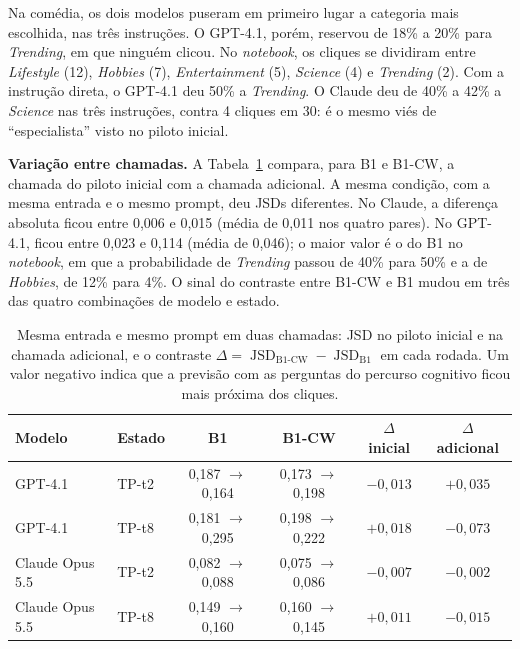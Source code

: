 \documentclass[12pt,oneside,a4paper,chapter=TITLE,english,brazil]{abntex2}
\DeclareMathOperator{\JSD}{JSD}
\begin{document}
Na comédia, os dois modelos puseram em primeiro lugar a categoria mais escolhida, nas três instruções. O GPT-4.1, porém, reservou de 18\% a 20\% para \textit{Trending}, em que ninguém clicou. No \textit{notebook}, os cliques se dividiram entre \textit{Lifestyle} (12), \textit{Hobbies} (7), \textit{Entertainment} (5), \textit{Science} (4) e \textit{Trending} (2). Com a instrução direta, o GPT-4.1 deu 50\% a \textit{Trending}. O Claude deu de 40\% a 42\% a \textit{Science} nas três instruções, contra 4 cliques em 30: é o mesmo viés de ``especialista'' visto no piloto inicial.

\begin{real}
\textbf{Variação entre chamadas.} A Tabela~\ref{tab:estabilidade} compara, para B1 e B1-CW, a chamada do piloto inicial com a chamada adicional. A mesma condição, com a mesma entrada e o mesmo prompt, deu JSDs diferentes. No Claude, a diferença absoluta ficou entre 0,006 e 0,015 (média de 0,011 nos quatro pares). No GPT-4.1, ficou entre 0,023 e 0,114 (média de 0,046); o maior valor é o do B1 no \textit{notebook}, em que a probabilidade de \textit{Trending} passou de 40\% para 50\% e a de \textit{Hobbies}, de 12\% para 4\%. O sinal do contraste entre B1-CW e B1 mudou em três das quatro combinações de modelo e estado.
\end{real}

\begin{table}[htb]
\centering
\caption{Mesma entrada e mesmo prompt em duas chamadas: JSD no piloto inicial e na chamada adicional, e o contraste $\Delta=\JSD_{\text{B1-CW}}-\JSD_{\text{B1}}$ em cada rodada. Um valor negativo indica que a previsão com as perguntas do percurso cognitivo ficou mais próxima dos cliques.}
\label{tab:estabilidade}
\footnotesize
\begin{tabular}{@{}llcccc@{}}
\toprule
\textbf{Modelo} & \textbf{Estado} & \textbf{B1} & \textbf{B1-CW} & \textbf{$\Delta$ inicial} & \textbf{$\Delta$ adicional} \\
\midrule
GPT-4.1 & TP-t2 & 0,187 $\to$ 0,164 & 0,173 $\to$ 0,198 & $-0{,}013$ & $+0{,}035$ \\
GPT-4.1 & TP-t8 & 0,181 $\to$ 0,295 & 0,198 $\to$ 0,222 & $+0{,}018$ & $-0{,}073$ \\
Claude Opus 5.5 & TP-t2 & 0,082 $\to$ 0,088 & 0,075 $\to$ 0,086 & $-0{,}007$ & $-0{,}002$ \\
Claude Opus 5.5 & TP-t8 & 0,149 $\to$ 0,160 & 0,160 $\to$ 0,145 & $+0{,}011$ & $-0{,}015$ \\
\bottomrule
\end{tabular}
\end{table}
\end{document}
